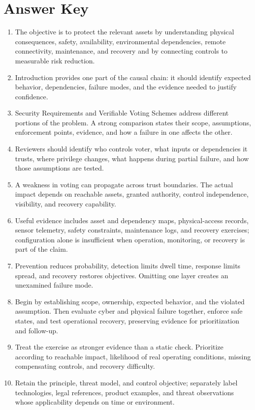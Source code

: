 \documentclass[11pt]{article}
\begin{document}
\section*{Answer Key}
\begin{enumerate}
\item The objective is to protect the relevant assets by understanding physical consequences, safety, availability, environmental dependencies, remote connectivity, maintenance, and recovery and by connecting controls to measurable risk reduction.
\item Introduction provides one part of the causal chain: it should identify expected behavior, dependencies, failure modes, and the evidence needed to justify confidence.
\item Security Requirements and Verifiable Voting Schemes address different portions of the problem. A strong comparison states their scope, assumptions, enforcement points, evidence, and how a failure in one affects the other.
\item Reviewers should identify who controls voter, what inputs or dependencies it trusts, where privilege changes, what happens during partial failure, and how those assumptions are tested.
\item A weakness in voting can propagate across trust boundaries. The actual impact depends on reachable assets, granted authority, control independence, visibility, and recovery capability.
\item Useful evidence includes asset and dependency maps, physical-access records, sensor telemetry, safety constraints, maintenance logs, and recovery exercises; configuration alone is insufficient when operation, monitoring, or recovery is part of the claim.
\item Prevention reduces probability, detection limits dwell time, response limits spread, and recovery restores objectives. Omitting one layer creates an unexamined failure mode.
\item Begin by establishing scope, ownership, expected behavior, and the violated assumption. Then evaluate cyber and physical failure together, enforce safe states, and test operational recovery, preserving evidence for prioritization and follow-up.
\item Treat the exercise as stronger evidence than a static check. Prioritize according to reachable impact, likelihood of real operating conditions, missing compensating controls, and recovery difficulty.
\item Retain the principle, threat model, and control objective; separately label technologies, legal references, product examples, and threat observations whose applicability depends on time or environment.
\end{enumerate}
\end{document}
